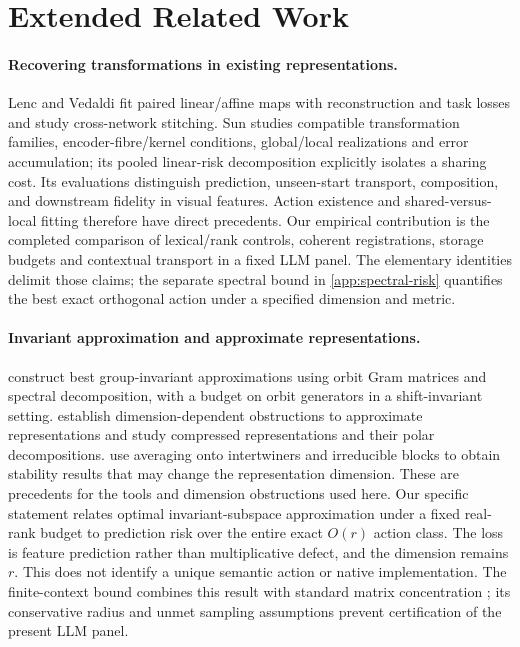 \section{Extended Related Work}
\label{app:related-work}
\paragraph{Recovering transformations in existing representations.}
Lenc and Vedaldi \citeyearpar{lenc2015understanding} fit paired linear/affine maps with reconstruction and task losses and study cross-network stitching. Sun \citeyearpar{sun2026transformationlaws} studies compatible transformation families, encoder-fibre/kernel conditions, global/local realizations and error accumulation; its pooled linear-risk decomposition explicitly isolates a sharing cost. Its evaluations distinguish prediction, unseen-start transport, composition, and downstream fidelity in visual features. Action existence and shared-versus-local fitting therefore have direct precedents. Our empirical contribution is the completed comparison of lexical/rank controls, coherent registrations, storage budgets and contextual transport in a fixed LLM panel. The elementary identities delimit those claims; the separate spectral bound in \cref{app:spectral-risk} quantifies the best exact orthogonal action under a specified dimension and metric.


\paragraph{Invariant approximation and approximate representations.}
\citet{barbieri2020approximation} construct best group-invariant approximations using orbit Gram matrices and spectral decomposition, with a budget on orbit generators in a shift-invariant setting. \citet{moore2015approximate} establish dimension-dependent obstructions to approximate representations and study compressed representations and their polar decompositions. \citet{gowers2017inverse} use averaging onto intertwiners and irreducible blocks to obtain stability results that may change the representation dimension. These are precedents for the tools and dimension obstructions used here. Our specific statement relates optimal invariant-subspace approximation under a fixed real-rank budget to prediction risk over the entire exact $O(r)$ action class. The loss is feature prediction rather than multiplicative defect, and the dimension remains $r$. This does not identify a unique semantic action or native implementation. The finite-context bound combines this result with standard matrix concentration \citep{tropp2012user}; its conservative radius and unmet sampling assumptions prevent certification of the present LLM panel.

